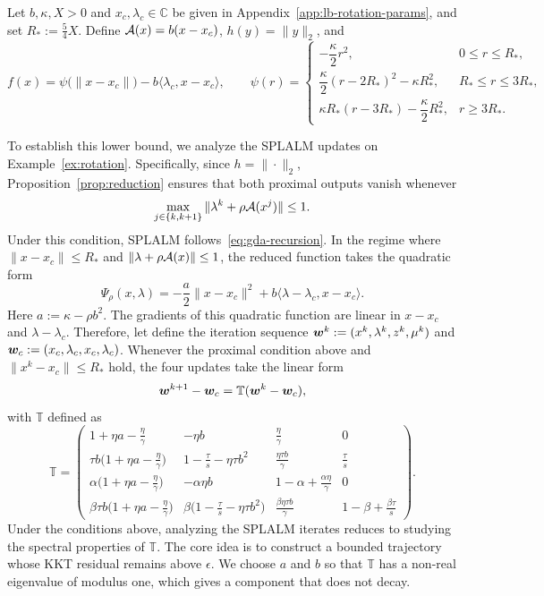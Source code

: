 \begin{example}
\label{ex:rotation}
Let \(b,\kappa,X>0\) and \(x_c,\lambda_c\in\mathbb C\) be given in
Appendix~\ref{app:lb-rotation-params}, and set \(R_*:=\frac54X\). Define
\(\mathcal{A}(x)=b(x-x_c)\), \(h(y)=\|y\|_2\), and
\[
f(x)=\psi\bigl(\|x-x_c\|\bigr)-b\langle\lambda_c,x-x_c\rangle,
\qquad
\psi(r)=
\begin{cases}
-\dfrac{\kappa}{2}r^2, & 0\le r\le R_*,\\[4pt]
\dfrac{\kappa}{2}(r-2R_*)^2-\kappa R_*^2, & R_*\le r\le3R_*,\\[4pt]
\kappa R_*(r-3R_*)-\dfrac{\kappa}{2}R_*^2, & r\ge3R_*.
\end{cases}
\]
\end{example}
To establish this lower bound, we analyze the SPLALM updates on
Example~\ref{ex:rotation}. Specifically, since \(h=\|\cdot\|_2\), Proposition~\ref{prop:reduction} ensures that both proximal outputs vanish
whenever
\[
\max_{j\in\{k,k+1\}}\|\lambda^k+\rho\mathcal{A}(x^j)\|\le1.
\] 
Under this condition, SPLALM follows~\eqref{eq:gda-recursion}. In the regime where \(\|x-x_c\|\le R_*\) and \(\|\lambda+\rho\mathcal{A}(x)\|\le1\),
the reduced function takes the quadratic form
\[
\Psi_\rho(x,\lambda)
=-\frac{a}{2}\|x-x_c\|^2+b\langle\lambda-\lambda_c,x-x_c\rangle .
\]
Here \(a:=\kappa-\rho b^2\). The gradients of this quadratic function are
linear in \(x-x_c\) and \(\lambda-\lambda_c\). 
Therefore, let define the iteration sequence \(\bm{w}^k:=(x^k,\lambda^k,z^k,\mu^k)\) and
\(\bm{w}_c:=(x_c,\lambda_c,x_c,\lambda_c)\). Whenever the proximal condition
above and \(\|x^k-x_c\|\le R_*\) hold, the four updates take the linear form
\[
\bm{w}^{k+1}-\bm{w}_c=\mathbb T(\bm{w}^k-\bm{w}_c),
\] with $\mathbb T$ defined as 
\begin{equation}
\label{eq:rot-matrix}
\mathbb T=\begin{pmatrix}
1+\eta a-\tfrac{\eta}{\gamma} & -\eta b & \tfrac{\eta}{\gamma} & 0\\[2pt]
\tau b\bigl(1+\eta a-\tfrac{\eta}{\gamma}\bigr) & 1-\tfrac{\tau}{s}-\eta\tau b^2
  & \tfrac{\eta\tau b}{\gamma} & \tfrac{\tau}{s}\\[2pt]
\alpha\bigl(1+\eta a-\tfrac{\eta}{\gamma}\bigr) & -\alpha\eta b
  & 1-\alpha+\tfrac{\alpha\eta}{\gamma} & 0\\[2pt]
\beta\tau b\bigl(1+\eta a-\tfrac{\eta}{\gamma}\bigr)
  & \beta\bigl(1-\tfrac{\tau}{s}-\eta\tau b^2\bigr)
  & \tfrac{\beta\eta\tau b}{\gamma} & 1-\beta+\tfrac{\beta\tau}{s}
\end{pmatrix}.
\end{equation}
Under the conditions above, analyzing the SPLALM iterates reduces to
studying the spectral properties of \(\mathbb T\).
The core idea is to construct a bounded trajectory whose KKT residual remains
above \(\epsilon\). We choose \(a\) and \(b\) so that \(\mathbb T\) has a
non-real eigenvalue of modulus one, which gives a component that does not
decay.

